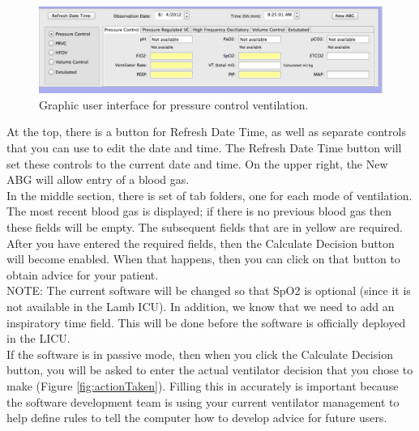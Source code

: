 \begin{figure}[htbp] 
   \centering
   \includegraphics[width=\textwidth]{PC_Zoom} 
   \caption{Graphic user interface for pressure control ventilation.}
   \label{fig:PCZoom}
\end{figure}

At the top, there is a button for Refresh Date Time, as well as separate controls that you can use to edit the date
and time.  The Refresh Date Time button will set these controls to the current date and time.  On the upper right,
the New ABG will allow entry of a blood gas.\\

In the middle section, there is set of tab folders, one for each mode of ventilation.  The most recent blood
gas is displayed;  if there is no previous blood gas then these fields will be empty.  The subsequent fields
that are in yellow are required.  After you have entered the required fields, then the Calculate Decision button will
become enabled.  When that happens, then you can click on that button to obtain advice for your patient.\\

NOTE:  The current software will be changed so that SpO2 is optional (since it is not available in the Lamb ICU).  In 
addition, we know that we need to add an inspiratory time field.  This will be done before the software is officially
deployed in the LICU.\\

If the software is in passive mode, then when you click the Calculate Decision button, you will be asked to enter
the actual ventilator decision that you chose to make (Figure \vref{fig:actionTaken}). Filling this in accurately is
important because the software development team is using your current ventilator management to help
define rules to tell the computer how to develop advice for future users.\\

